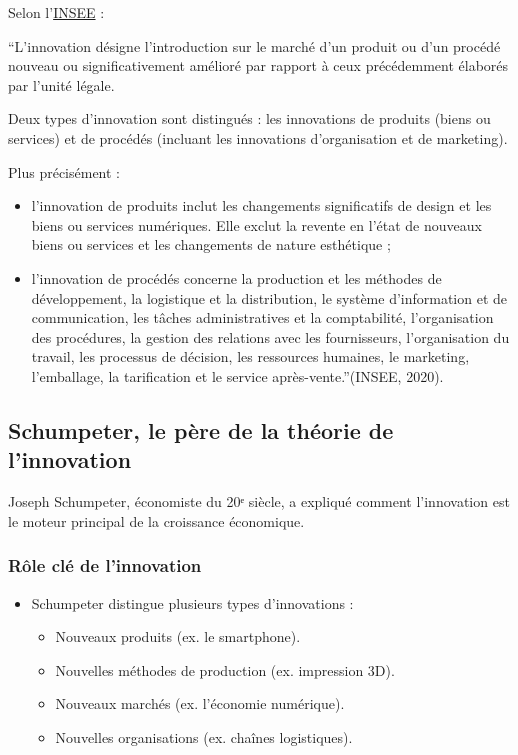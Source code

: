 \documentclass[
  letterpaper,
  DIV=11,
  numbers=noendperiod]{scrartcl}
\providecommand{\tightlist}{%
  \setlength{\itemsep}{0pt}\setlength{\parskip}{0pt}}\usepackage{longtable,booktabs,array}
\begin{document}
Selon
l'\href{https://www.insee.fr/fr/metadonnees/definition/c1182}{INSEE} :

``L'innovation désigne l'introduction sur le marché d'un produit ou d'un
procédé nouveau ou significativement amélioré par rapport à ceux
précédemment élaborés par l'unité légale.

Deux types d'innovation sont distingués : les innovations de produits
(biens ou services) et de procédés (incluant les innovations
d'organisation et de marketing).

Plus précisément :

\begin{itemize}
\item
  l'innovation de produits inclut les changements significatifs de
  design et les biens ou services numériques. Elle exclut la revente en
  l'état de nouveaux biens ou services et les changements de nature
  esthétique ;
\item
  l'innovation de procédés concerne la production et les méthodes de
  développement, la logistique et la distribution, le système
  d'information et de communication, les tâches administratives et la
  comptabilité, l'organisation des procédures, la gestion des relations
  avec les fournisseurs, l'organisation du travail, les processus de
  décision, les ressources humaines, le marketing, l'emballage, la
  tarification et le service après-vente.''(INSEE, 2020).
\end{itemize}

\subsection{Schumpeter, le père de la théorie de
l'innovation}\label{schumpeter-le-puxe8re-de-la-thuxe9orie-de-linnovation}

Joseph Schumpeter, économiste du 20ᵉ siècle, a expliqué comment
l'innovation est le moteur principal de la croissance économique.

\subsubsection{Rôle clé de
l'innovation}\label{ruxf4le-cluxe9-de-linnovation}

\begin{itemize}
\tightlist
\item
  Schumpeter distingue plusieurs types d'innovations :

  \begin{itemize}
  \item
    Nouveaux produits (ex. le smartphone).
  \item
    Nouvelles méthodes de production (ex. impression 3D).
  \item
    Nouveaux marchés (ex. l'économie numérique).
  \item
    Nouvelles organisations (ex. chaînes logistiques).
  \end{itemize}
\end{itemize}
\end{document}
